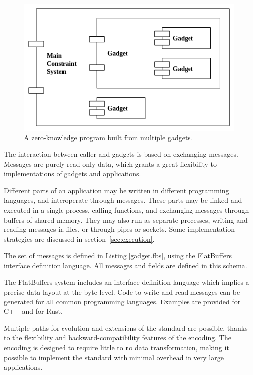 \begin{figure}[!h]
	\centering
	\includegraphics[width=0.7\linewidth]{graphics/program_components.png}
	\caption{A zero-knowledge program built from multiple gadgets.}
	\label{program_components}
\end{figure}



	The interaction between caller and gadgets is based on exchanging messages.
	Messages are purely read-only data, which grants a great flexibility to
	implementations of gadgets and applications.


	Different parts of an application may be written in different programming languages, and interoperate through messages.
	These parts may be linked and executed in a single process, calling functions,
	and exchanging messages through buffers of shared memory.
	They may also run as separate processes, writing and reading messages in files, or through pipes or sockets.
	Some implementation strategies are discussed in section~\ref{sec:execution}.

\label{message_definition}

	The set of messages is defined in Listing \ref{gadget.fbs}, 
	using the FlatBuffers interface definition language.
	All messages and fields are defined in this schema.

	The FlatBuffers system includes an interface definition language
	which implies a precise data layout at the byte level.
	Code to write and read messages can be generated for all common programming languages.
	Examples are provided for C++ and for Rust.

	Multiple paths for evolution and extensions of the standard are possible,
	thanks to the flexibility and backward-compatibility features of the encoding.
	The encoding is designed to require little to no data transformation, making it possible
	to implement the standard with minimal overhead in very large applications.


